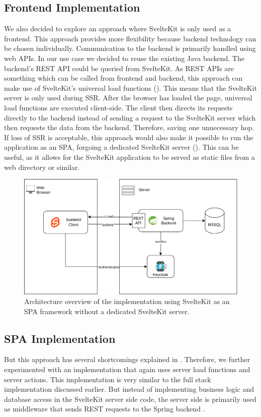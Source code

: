 \subsection{Frontend Implementation}
We also decided to explore an approach where SvelteKit is only used as a frontend. This approach provides more flexibility because backend technology can be chosen individually. Communication to the backend is primarily handled using web APIs. In our use case we decided to reuse the existing Java backend. The backend's REST API could be queried from SvelteKit. As REST APIs are something which can be called from frontend and backend, this approach can make use of SvelteKit's universal load functions (). This means that the SvelteKit server is only used during SSR. After the browser has loaded the page, universal load functions are executed client-side. The client then directs its requests directly to the backend instead of sending a request to the SvelteKit server which then requests the data from the backend. Therefore, saving one unnecessary hop. If loss of SSR is acceptable, this approach would also make it possible to run the application as an SPA, forgoing a dedicated SvelteKit server (). This can be useful, as it allows for the SvelteKit application to be served as static files from a web directory or similar.

\begin{figure}[ht]
    \centering
    \includegraphics[width=.8\linewidth]{assets/dswfd-architecture-spa}
    \caption{Architecture overview of the implementation using SvelteKit as an SPA framework without a dedicated SvelteKit server.}
    \label{fig:dswfd-architecture-spa}
\end{figure}

\subsection{SPA Implementation}
\label{sec:implementation-redirect}
But this approach has several shortcomings explained in . Therefore, we further experimented with an implementation that again uses server load functions and server actions. This implementation is very similar to the full stack implementation discussed earlier. But instead of implementing business logic and database access in the SvelteKit server side code, the server side is primarily used as middleware that sends REST requests to the Spring backend .

